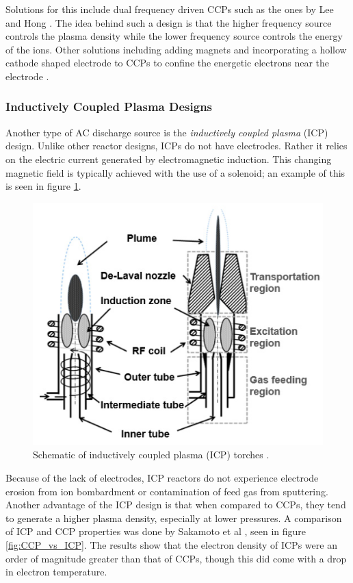 Solutions for this include dual frequency driven CCPs such as the ones by Lee and Hong \cite{Lee2021}. The idea behind such a design is that the higher frequency source controls the plasma density while the lower frequency source controls the energy of the ions. Other solutions including adding magnets and incorporating a hollow cathode shaped electrode to CCPs to confine the energetic electrons near the electrode \cite{Ohtsu2018}.

\subsubsection{Inductively Coupled Plasma Designs}

Another type of AC discharge source is the \textit{inductively coupled plasma} (ICP) design. Unlike other reactor designs, ICPs do not have electrodes. Rather it relies on the electric current generated by electromagnetic induction. This changing magnetic field is typically achieved with the use of a solenoid; an example of this is seen in figure \ref{fig:ICP_reactor}. 

\begin{figure}[h!]
	\centering
	\includegraphics[width=0.7\linewidth]{chapter_2/figures/ICP_reactor.png}
	\caption{Schematic of inductively coupled plasma (ICP) torches \cite{Yu2021}.}
	\label{fig:ICP_reactor}
\end{figure} 

Because of the lack of electrodes, ICP reactors do not experience electrode erosion from ion bombardment or contamination of feed gas from sputtering. Another advantage of the ICP design is that when compared to CCPs, they tend to generate a higher plasma density, especially at lower pressures. A comparison of ICP and CCP properties was done by Sakamoto et al \cite{Sakamoto2009ComparisonOP}, seen in figure \ref{fig:CCP_vs_ICP}. The results show that the electron density of ICPs were an order of magnitude greater than that of CCPs, though this did come with a drop in electron temperature. 

